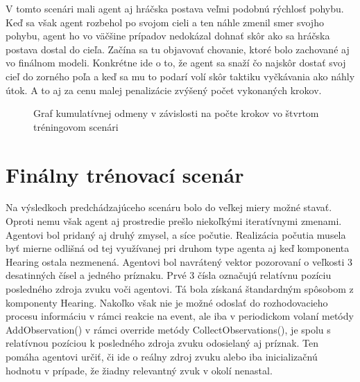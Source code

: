 \documentclass[slovak, master]{diploma}
\begin{document}
V tomto scenári mali agent aj hráčska postava veľmi podobnú rýchlosť pohybu. Keď sa však agent rozbehol po svojom cieli a ten náhle zmenil smer svojho pohybu, agent ho vo väčšine prípadov nedokázal dohnať skôr ako sa hráčska postava dostal do cieľa. Začína sa tu objavovať chovanie, ktoré bolo zachované aj vo finálnom modeli. Konkrétne ide o to, že agent sa snaží čo najskôr dostať svoj cieľ do zorného poľa a keď sa mu to podarí volí skôr taktiku vyčkávania ako náhly útok. A to aj za cenu malej penalizácie zvýšený počet vykonaných krokov. 

\begin{figure}[!htbp]
    \centering
    \caption{Graf kumulatívnej odmeny v závislosti na počte krokov vo štvrtom tréningovom scenári}
    \label{plt:fourthcenario}
\end{figure}

\section{Finálny trénovací scenár}
\label{sec:FinalScenario}
Na výsledkoch predchádzajúceho scenáru bolo do veľkej miery možné stavať. Oproti nemu však agent aj prostredie prešlo niekoľkými iteratívnymi zmenami. Agentovi bol pridaný aj druhý zmysel, a síce počutie. Realizácia počutia musela byť mierne odlišná od tej využívanej pri druhom type agenta aj keď komponenta Hearing ostala nezmenená. Agentovi bol navrátený vektor pozorovaní o veľkosti 3 desatinných čísel a jedného príznaku. Prvé 3 čísla označujú relatívnu pozíciu posledného zdroja zvuku voči agentovi. Tá bola získaná štandardným spôsobom z komponenty Hearing. Nakoľko však nie je možné odoslať do rozhodovacieho procesu informáciu v rámci reakcie na event, ale iba v periodickom volaní metódy AddObservation() v rámci override metódy CollectObservations(), je spolu s relatívnou pozíciou k posledného zdroja zvuku odosielaný aj príznak. Ten pomáha agentovi určiť, či ide o reálny zdroj zvuku alebo iba inicializačnú hodnotu v prípade, že žiadny relevantný zvuk v okolí nenastal. 
\end{document}
